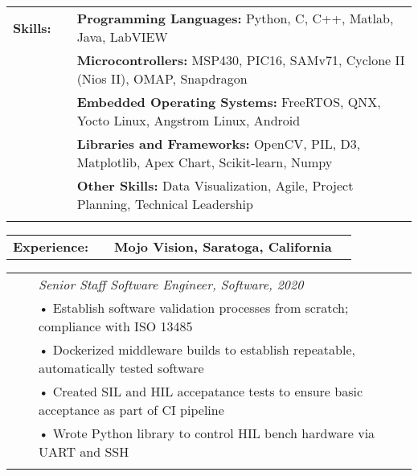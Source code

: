 \documentclass{minimal}
\begin{document}

\begin{center}
\fontsize{14}{12.8}\selectfont
\name\\
\fontsize{10}{12}\selectfont
\address\\
\phone\\
\email\\
\github\\
\end{center}
\vspace{0.5cm}

\begin{tabular}{ p{1.5cm} p{1cm} p{16cm} }
\textbf{Skills:} & & \textbf{Programming Languages:} Python, C, C++, Matlab, Java, LabVIEW\\
& & \textbf{Microcontrollers:} MSP430, PIC16, SAMv71, Cyclone II (Nios II), OMAP, Snapdragon\\
& & \textbf{Embedded Operating Systems:} FreeRTOS, QNX, Yocto Linux, Angstrom Linux, Android\\
& & \textbf{Libraries and Frameworks:} OpenCV, PIL, D3, Matplotlib, Apex Chart, Scikit-learn, Numpy\\
& & \textbf{Other Skills:} Data Visualization, Agile, Project Planning, Technical Leadership\\
& & \\
\end{tabular}

\begin{tabular}{ p{1.5cm} p{1cm} p{16cm} >{\raggedleft\arraybackslash}p{3cm} }
\textbf{Experience:} & & \textbf{Mojo Vision, Saratoga, California} & \\
\end{tabular}

\begin{tabular}{ p{1.5cm} p{1cm} p{16cm} >{\raggedleft\arraybackslash}p{3cm} }
& & \textit{Senior Staff Software Engineer, Software, 2020}\\
& & • Establish software validation processes from scratch; compliance with ISO 13485\\
& & • Dockerized middleware builds to establish repeatable, automatically tested software\\
& & • Created SIL and HIL accepatance tests to ensure basic acceptance as part of CI pipeline\\
& & • Wrote Python library to control HIL bench hardware via UART and SSH\\
& & \\
\end{tabular}
\end{document}
